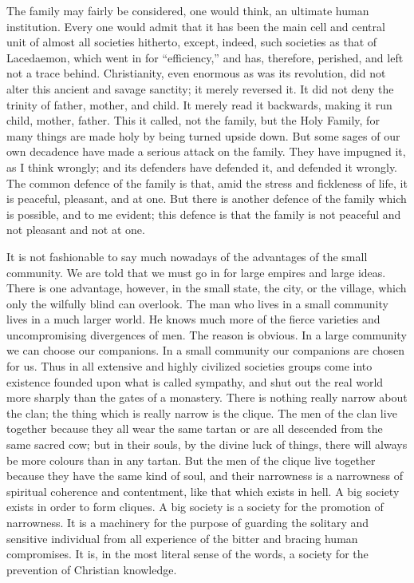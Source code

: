 The family may fairly be considered, one would think, an ultimate human institution. Every one would admit that it has been the main cell and central unit of almost all societies hitherto, except, indeed, such societies as that of Lacedaemon, which went in for “efficiency,” and has, therefore, perished, and left not a trace behind. Christianity, even enormous as was its revolution, did not alter this ancient and savage sanctity; it merely reversed it. It did not deny the trinity of father, mother, and child. It merely read it backwards, making it run child, mother, father. This it called, not the family, but the Holy Family, for many things are made holy by being turned upside down. But some sages of our own decadence have made a serious attack on the family. They have impugned it, as I think wrongly; and its defenders have defended it, and defended it wrongly. The common defence of the family is that, amid the stress and fickleness of life, it is peaceful, pleasant, and at one. But there is another defence of the family which is possible, and to me evident; this defence is that the family is not peaceful and not pleasant and not at one.

It is not fashionable to say much nowadays of the advantages of the small community. We are told that we must go in for large empires and large ideas. There is one advantage, however, in the small state, the city, or the village, which only the wilfully blind can overlook. The man who lives in a small community lives in a much larger world. He knows much more of the fierce varieties and uncompromising divergences of men. The reason is obvious. In a large community we can choose our companions. In a small community our companions are chosen for us. Thus in all extensive and highly civilized societies groups come into existence founded upon what is called sympathy, and shut out the real world more sharply than the gates of a monastery. There is nothing really narrow about the clan; the thing which is really narrow is the clique. The men of the clan live together because they all wear the same tartan or are all descended from the same sacred cow; but in their souls, by the divine luck of things, there will always be more colours than in any tartan. But the men of the clique live together because they have the same kind of soul, and their narrowness is a narrowness of spiritual coherence and contentment, like that which exists in hell. A big society exists in order to form cliques. A big society is a society for the promotion of narrowness. It is a machinery for the purpose of guarding the solitary and sensitive individual from all experience of the bitter and bracing human compromises. It is, in the most literal sense of the words, a society for the prevention of Christian knowledge.

